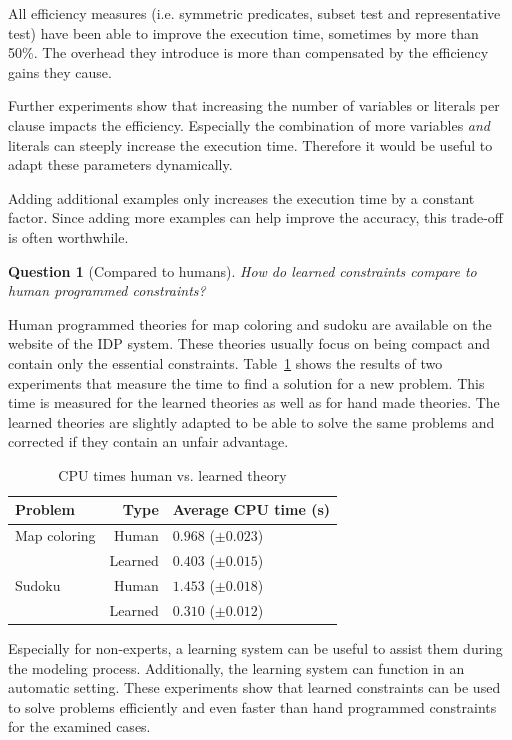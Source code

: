 \documentclass[letterpaper]{article}
\newtheorem{question}{Question}
\theoremstyle{definition}
\begin{document}
All efficiency measures (i.e. symmetric predicates, subset test and representative test) have been able to improve the execution time, sometimes by more than 50\%.
The overhead they introduce is more than compensated by the efficiency gains they cause.

Further experiments show that increasing the number of variables or literals per clause impacts the efficiency.
Especially the combination of more variables \emph{and} literals can steeply increase the execution time.
Therefore it would be useful to adapt these parameters dynamically.

Adding additional examples only increases the execution time by a constant factor.
Since adding more examples can help improve the accuracy, this trade-off is often worthwhile.

\begin{question}[Compared to humans]
  How do learned constraints compare to human programmed constraints?
\end{question}
Human programmed theories for map coloring and sudoku are available on the website of the IDP system.
These theories usually focus on being compact and contain only the essential constraints.
Table~\ref{tbl:mens} shows the results of two experiments that measure the time to find a solution for a new problem.
This time is measured for the learned theories as well as for hand made theories.
The learned theories are slightly adapted to be able to solve the same problems and corrected if they contain an unfair advantage.

  \begin{table}[!htp]
    \caption{CPU times human vs. learned theory}
    \begin{tabularx}{\linewidth}{lr|X}
      \textbf{Problem} & \textbf{Type} & \textbf{Average CPU time (s)} \\
      \toprule
      Map coloring & Human & $0.968$  ($\pm 0.023$) \\
      & Learned & $0.403$       ($\pm 0.015$) \\
      \midrule
      Sudoku & Human & $1.453$    ($\pm 0.018$) \\ 
      & Learned & $0.310$       ($\pm 0.012$)
    \end{tabularx}
    \label{tbl:mens}
  \end{table}

Especially for non-experts, a learning system can be useful to assist them during the modeling process.
Additionally, the learning system can function in an automatic setting.
These experiments show that learned constraints can be used to solve problems efficiently and even faster than hand programmed constraints for the examined cases.
\end{document}
